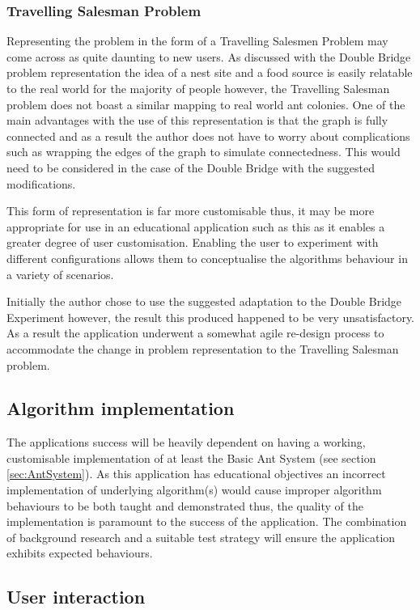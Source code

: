 \subsubsection{Travelling Salesman Problem}

Representing the problem in the form of a Travelling Salesmen Problem may come across as quite daunting to new users. As discussed with the Double Bridge problem representation the idea of a nest site and a food source is easily relatable to the real world for the majority of people however, the Travelling Salesman problem does not boast a similar mapping to real world ant colonies. One of the main advantages with the use of this representation is that the graph is fully connected and as a result the author does not have to worry about complications such as wrapping the edges of the graph to simulate connectedness. This would need to be considered in the case of the Double Bridge with the suggested modifications.

This form of representation is far more customisable thus, it may be more appropriate for use in an educational application such as this as it enables a greater degree of user customisation. Enabling the user to experiment with different configurations allows them to conceptualise the algorithms behaviour in a variety of scenarios.

Initially the author chose to use the suggested adaptation to the Double Bridge Experiment however, the result this produced happened to be very unsatisfactory. As a result the application underwent a somewhat agile re-design process to accommodate the change in problem representation to the Travelling Salesman problem.

\subsection{Algorithm implementation}

The applications success will be heavily dependent on having a working, customisable implementation of at least the Basic Ant System (see section \ref{sec:AntSystem}). As this application has educational objectives an incorrect implementation of underlying algorithm(s) would cause improper algorithm behaviours to be both taught and demonstrated thus, the quality of the implementation is paramount to the success of the application. The combination of background research and a suitable test strategy will ensure the application exhibits expected behaviours.

\subsection{User interaction}


